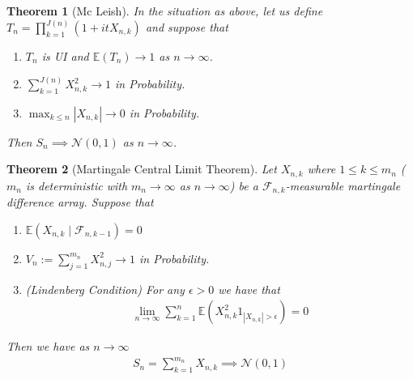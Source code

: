 \documentclass[11pt,a4paper, final]{article}
\newtheorem{thm}{Theorem}[section]
\theoremstyle{definition}
\begin{document}
\begin{thm}[Mc Leish] In the situation as above, let us define \\ $T_n = \prod_{k=1}^{J(n)} (1 + it X_{n,k})$ and suppose that
\begin{enumerate}
\item $T_n$ is UI and $\mathbb{E}(T_n) \to 1$ as $n \to \infty$.
\item $ \sum_{k=1}^{J(n)} X_{n,k}^2 \to 1$ in Probability.
\item $\max_{k \leq n} |X_{n,k}| \to 0$ in Probability. 
\end{enumerate}
Then $S_n \implies \mathcal{N}(0,1)$ as $n \to \infty$. 
\end{thm}
\newpage
\begin{thm}[Martingale Central Limit Theorem] Let $X_{n,k}$ where $1 \leq k \leq m_n$ ($m_n$ is deterministic with $m_n \to \infty$ as $n \to \infty$) be a $\mathcal{F}_{n,k}$-measurable martingale difference array. Suppose that 
\begin{enumerate}
\item $\mathbb{E}(X_{n,k} \mid \mathcal{F}_{n,k-1}) = 0$ 
\item $V_n:= \sum_{j=1}^{m_n} X_{n,j}^2 \to 1$ in Probability.
\item (Lindenberg Condition) For any $\epsilon >0$ we have that 
\begin{align*}
\lim_{n \to \infty}  \sum_{k=1}^n \mathbb{E}(X_{n,k}^2 1_{ | X_{n,k}| > \epsilon}) = 0 
\end{align*}
\end{enumerate}
Then we have as $n \to \infty$ 
\begin{align*}
S_n=  \sum_{k=1}^{m_n} X_{n,k} \implies \mathcal{N}(0,1) 
\end{align*}
\end{thm}
\newpage
\end{document}
